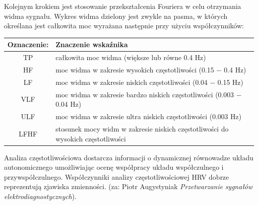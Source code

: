 \documentclass[a4paper, 11pt]{article}
\begin{document}
Kolejnym krokiem jest stosowanie przekształcenia Fouriera w celu otrzymania widma sygnału. Wykres widma dzielony jest zwykle na pasma, w których określana jest całkowita moc wyrażana następnie przy użyciu współczynników:

\begin{tabular}{|c|l|}
\hline
Oznaczenie: & Znaczenie wskaźnika \\ \hline
TP & całkowita moc widma (większe lub równe 0.4 Hz)  \\ \hline
HF & moc widma w zakresie wysokich częstotliwości (0.15 − 0.4 Hz) \\ \hline
LF & moc widma w zakresie niskich częstotliwości (0.04 − 0.15 Hz) \\ \hline
VLF & moc widma w zakresie bardzo niskich częstotliwości (0.003 − 0.04 Hz)  \\ \hline
ULF & moc widma w zakresie ultra niskich częstotliwości (0.003 Hz)  \\ \hline
LFHF & stosunek mocy widm w zakresie niskich częstotliwości do wysokich częstotliwości  \\
\hline
\end{tabular}


Analiza częstotliwościowa dostarcza informacji o dynamicznej równowadze układu autonomicznego umożliwiając ocenę współpracy układu współczulnego i przywspółczulnego. Współczynniki analizy częstotliwościowej HRV dobrze reprezentują zjawiska zmienności. (za: Piotr Augystyniak \textit{Przetwarzanie sygnałów elektrodiagnostycznych}).
\end{document}

